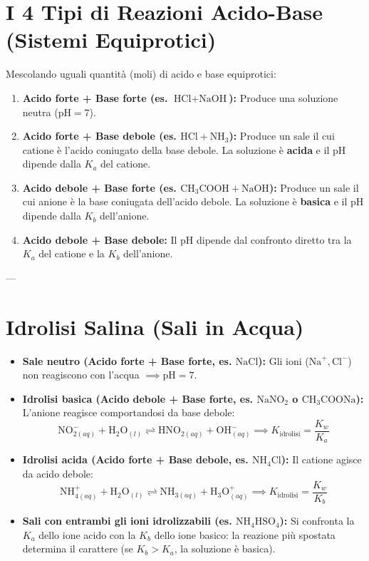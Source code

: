 \documentclass[11pt, a4paper, openright]{book}
\begin{document}
\section{I 4 Tipi di Reazioni Acido-Base (Sistemi Equiprotici)}
Mescolando uguali quantità (moli) di acido e base equiprotici:
\begin{enumerate}
    \item \textbf{Acido forte + Base forte (es. $\text{HCl} + \text{NaOH}$):} Produce una soluzione neutra ($\text{pH} = 7$).
    \item \textbf{Acido forte + Base debole (es. $\text{HCl} + \text{NH}_3$):} Produce un sale il cui catione è l'acido coniugato della base debole. La soluzione è \textbf{acida} e il pH dipende dalla $K_a$ del catione.
    \item \textbf{Acido debole + Base forte (es. $\text{CH}_3\text{COOH} + \text{NaOH}$):} Produce un sale il cui anione è la base coniugata dell'acido debole. La soluzione è \textbf{basica} e il pH dipende dalla $K_b$ dell'anione.
    \item \textbf{Acido debole + Base debole:} Il pH dipende dal confronto diretto tra la $K_a$ del catione e la $K_b$ dell'anione.
\end{enumerate}
---

\section{Idrolisi Salina (Sali in Acqua)}
\begin{itemize}
    \item \textbf{Sale neutro (Acido forte + Base forte, es. $\text{NaCl}$):} Gli ioni ($\text{Na}^+, \text{Cl}^-$) non reagiscono con l'acqua $\implies \text{pH} = 7$.
    \item \textbf{Idrolisi basica (Acido debole + Base forte, es. $\text{NaNO}_2$ o $\text{CH}_3\text{COONa}$):} L'anione reagisce comportandosi da base debole:
    \begin{equation}
    \text{NO}_{2(aq)}^- + \text{H}_2\text{O}_{(l)} \rightleftharpoons \text{HNO}_{2(aq)} + \text{OH}^-_{(aq)} \implies K_{\text{idrolisi}} = \frac{K_w}{K_a}
    \end{equation}
    \item \textbf{Idrolisi acida (Acido forte + Base debole, es. $\text{NH}_4\text{Cl}$):} Il catione agisce da acido debole:
    \begin{equation}
    \text{NH}_{4(aq)}^+ + \text{H}_2\text{O}_{(l)} \rightleftharpoons \text{NH}_{3(aq)} + \text{H}_3\text{O}^+_{(aq)} \implies K_{\text{idrolisi}} = \frac{K_w}{K_b}
    \end{equation}
    \item \textbf{Sali con entrambi gli ioni idrolizzabili (es. $\text{NH}_4\text{HSO}_4$):} Si confronta la $K_a$ dello ione acido con la $K_b$ dello ione basico: la reazione più spostata determina il carattere (se $K_b > K_a$, la soluzione è basica).
\end{itemize}
\end{document}
